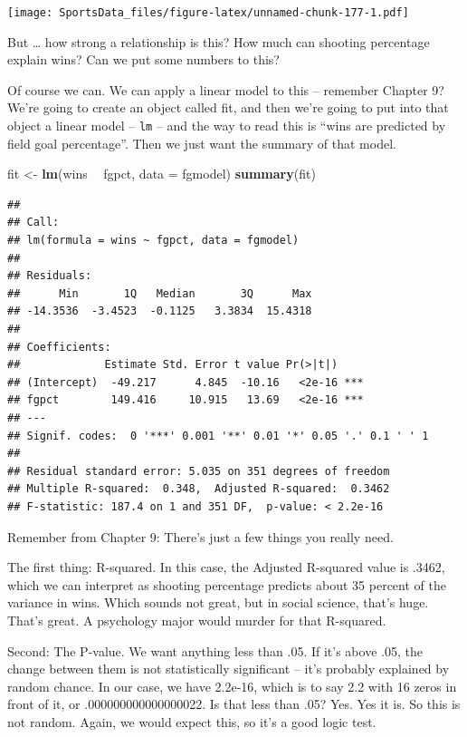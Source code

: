 \documentclass[]{book}
\newenvironment{Shaded}{\begin{snugshade}}{\end{snugshade}}
\newcommand{\DataTypeTok}[1]{\textcolor[rgb]{0.13,0.29,0.53}{#1}}
\newcommand{\KeywordTok}[1]{\textcolor[rgb]{0.13,0.29,0.53}{\textbf{#1}}}
\newcommand{\NormalTok}[1]{#1}
\newcommand{\OperatorTok}[1]{\textcolor[rgb]{0.81,0.36,0.00}{\textbf{#1}}}
\newcommand{\StringTok}[1]{\textcolor[rgb]{0.31,0.60,0.02}{#1}}
\begin{document}
\texttt{[image: SportsData\_files/figure-latex/unnamed-chunk-177-1.pdf]}

But \ldots{} how strong a relationship is this? How much can shooting percentage explain wins? Can we put some numbers to this?

Of course we can. We can apply a linear model to this -- remember Chapter 9? We're going to create an object called fit, and then we're going to put into that object a linear model -- \texttt{lm} -- and the way to read this is ``wins are predicted by field goal percentage''. Then we just want the summary of that model.

\begin{Shaded}
\begin{Highlighting}[]
\NormalTok{fit <-}\StringTok{ }\KeywordTok{lm}\NormalTok{(wins }\OperatorTok{~}\StringTok{ }\NormalTok{fgpct, }\DataTypeTok{data =}\NormalTok{ fgmodel)}
\KeywordTok{summary}\NormalTok{(fit)}
\end{Highlighting}
\end{Shaded}

\begin{verbatim}
## 
## Call:
## lm(formula = wins ~ fgpct, data = fgmodel)
## 
## Residuals:
##      Min       1Q   Median       3Q      Max 
## -14.3536  -3.4523  -0.1125   3.3834  15.4318 
## 
## Coefficients:
##             Estimate Std. Error t value Pr(>|t|)    
## (Intercept)  -49.217      4.845  -10.16   <2e-16 ***
## fgpct        149.416     10.915   13.69   <2e-16 ***
## ---
## Signif. codes:  0 '***' 0.001 '**' 0.01 '*' 0.05 '.' 0.1 ' ' 1
## 
## Residual standard error: 5.035 on 351 degrees of freedom
## Multiple R-squared:  0.348,  Adjusted R-squared:  0.3462 
## F-statistic: 187.4 on 1 and 351 DF,  p-value: < 2.2e-16
\end{verbatim}

Remember from Chapter 9: There's just a few things you really need.

The first thing: R-squared. In this case, the Adjusted R-squared value is .3462, which we can interpret as shooting percentage predicts about 35 percent of the variance in wins. Which sounds not great, but in social science, that's huge. That's great. A psychology major would murder for that R-squared.

Second: The P-value. We want anything less than .05. If it's above .05, the change between them is not statistically significant -- it's probably explained by random chance. In our case, we have 2.2e-16, which is to say 2.2 with 16 zeros in front of it, or .000000000000000022. Is that less than .05? Yes. Yes it is. So this is not random. Again, we would expect this, so it's a good logic test.
\end{document}
